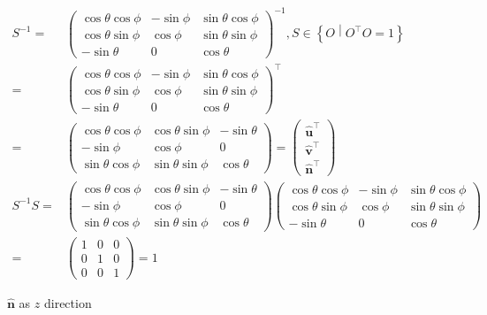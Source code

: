 \documentclass[
]{book}
\theoremstyle{definition}
\theoremstyle{definition}
\theoremstyle{definition}
\theoremstyle{definition}
\theoremstyle{remark}
\begin{document}
\[
\begin{aligned}
S^{-1}= & \begin{pmatrix}\cos\theta\cos\phi & -\sin\phi & \sin\theta\cos\phi\\
\cos\theta\sin\phi & \cos\phi & \sin\theta\sin\phi\\
-\sin\theta & 0 & \cos\theta
\end{pmatrix}^{-1},S\in\left\{ O\middle|O^{\intercal}O=1\right\} \\
= & \begin{pmatrix}\cos\theta\cos\phi & -\sin\phi & \sin\theta\cos\phi\\
\cos\theta\sin\phi & \cos\phi & \sin\theta\sin\phi\\
-\sin\theta & 0 & \cos\theta
\end{pmatrix}^{\intercal}\\
= & \begin{pmatrix}\cos\theta\cos\phi & \cos\theta\sin\phi & -\sin\theta\\
-\sin\phi & \cos\phi & 0\\
\sin\theta\cos\phi & \sin\theta\sin\phi & \cos\theta
\end{pmatrix}=\begin{pmatrix}\hat{\boldsymbol{u}}^{\intercal}\\
\hat{\boldsymbol{v}}^{\intercal}\\
\hat{\boldsymbol{n}}^{\intercal}
\end{pmatrix}\\
S^{-1}S= & \begin{pmatrix}\cos\theta\cos\phi & \cos\theta\sin\phi & -\sin\theta\\
-\sin\phi & \cos\phi & 0\\
\sin\theta\cos\phi & \sin\theta\sin\phi & \cos\theta
\end{pmatrix}\begin{pmatrix}\cos\theta\cos\phi & -\sin\phi & \sin\theta\cos\phi\\
\cos\theta\sin\phi & \cos\phi & \sin\theta\sin\phi\\
-\sin\theta & 0 & \cos\theta
\end{pmatrix}\\
= & \begin{pmatrix}1 & 0 & 0\\
0 & 1 & 0\\
0 & 0 & 1
\end{pmatrix}=1
\end{aligned}
\]

\(\hat{\boldsymbol{n}}\) as \(z\) direction
\end{document}
